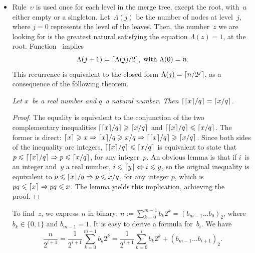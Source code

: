 \begin{itemize}
  \item Rule~\(\upsilon\) is used once for each level in the merge
    tree, except the root, with~\(u\) either
    empty or a singleton.  Let~\(\Lambda(j)\) be the number of nodes
    at level~\(j\), where \(j=0\) represents the level of the
    leaves. Then, the number~\(z\) we are looking for is the greatest
    natural satisfying the equation \(\Lambda(z) = 1\), at the
    root. Function~ implies
    \begin{equation*}
      \Lambda(j+1) = \lceil{\Lambda(j)/2}\rceil,\; \text{with \(\Lambda(0)
        = n\)}.
    \end{equation*}
    This recurrence is equivalent to the closed form \(\Lambda(j) =
    \lceil{n/2^j}\rceil\), as a consequence of the following theorem.
\begin{thm}
\label{thm:ceilings}
\textsl{Let \(x\)~be a real number and \(q\)~a natural number. Then
  \(\lceil{\lceil{x}\rceil/q}\rceil = \lceil{x/q}\rceil\).}
\end{thm}
\begin{proof}
  The equality is equivalent to the conjunction of the two
  complementary inequalities \(\lceil{\lceil{x}\rceil/q}\rceil \geqslant
  \lceil{x/q}\rceil\) and \(\lceil{\lceil{x}\rceil/q}\rceil \leqslant
  \lceil{x/q}\rceil\). The former is direct: \(\lceil{x}\rceil \geqslant x
  \Rightarrow \lceil{x}\rceil/q \geqslant x/q \Rightarrow
  \lceil{\lceil{x}\rceil/q}\rceil \geqslant \lceil{x/q}\rceil\). Since both sides
  of the inequality are integers, \(\lceil{\lceil{x}\rceil/q}\rceil \leqslant
  \lceil{x/q}\rceil\) is equivalent to state that \(p \leqslant
  \lceil{\lceil{x}\rceil/q}\rceil \Rightarrow p \leqslant \lceil{x/q}\rceil\), for
  any integer~\(p\). An obvious lemma is that if \(i\)~is an integer
  and~\(y\) a real number, \(i \leqslant \lceil{y}\rceil \Leftrightarrow i
  \leqslant y\), so the original inequality is equivalent to \(p
  \leqslant \lceil{x}\rceil/q \Rightarrow p \leqslant x/q\), for any
  integer \(p\), which is \(pq \leqslant \lceil{x}\rceil \Rightarrow pq
  \leqslant x\). The lemma yields this implication, achieving the
  proof.
\end{proof}
    \noindent To find~\(z\), we express~\(n\) in binary:
    \(n :=\!  \sum_{k=0}^{m-1}{b_k2^k} = (b_{m-1}\ldots
    b_0)_2\), where \(b_k \in \{0,1\}\) and \(b_{m-1} = 1\). It is
    easy to derive a formula for~\(b_i\). We have
    \begin{equation}
      \frac{n}{2^{i+1}}
      = \frac{1}{2^{i+1}}\sum_{k=0}^{m-1}{b_k2^{k}}
      = \frac{1}{2^{i+1}}\sum_{k=0}^{i}{b_k2^k} + (b_{m-1}\dots b_{i+1})_2.

\end{equation}
\end{itemize}
